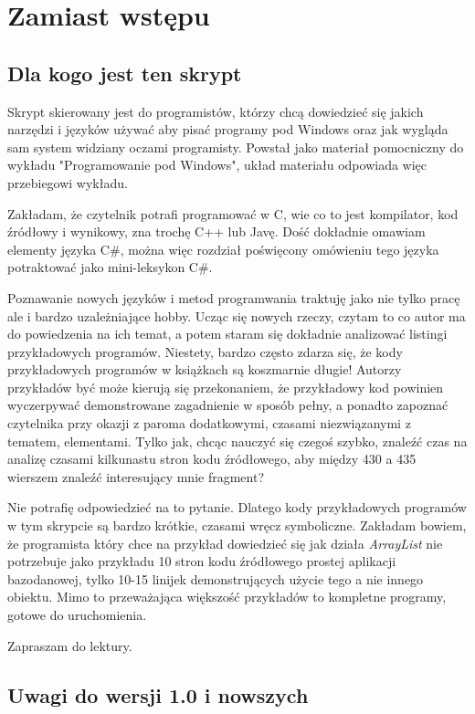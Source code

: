 ﻿\chapter*{Zamiast wstępu}

\section*{Dla kogo jest ten skrypt}

Skrypt skierowany jest do programistów, którzy chcą dowiedzieć się jakich narzędzi i języków używać
aby pisać programy pod Windows oraz jak wygląda sam system widziany oczami programisty. Powstał jako
materiał pomocniczny do wykładu "Programowanie pod Windows", układ materiału odpowiada więc 
przebiegowi wykładu.

Zakładam, że czytelnik potrafi programować w C, wie co to jest kompilator, kod źródłowy i wynikowy, zna
trochę C++ lub Javę. Dość dokładnie omawiam elementy języka C\#, można więc rozdział poświęcony omówieniu
tego języka potraktować jako mini-leksykon C\#.

Poznawanie nowych języków i metod programwania traktuję jako nie tylko pracę ale i bardzo uzależniające
hobby. Ucząc się nowych rzeczy, czytam to co autor ma do powiedzenia na ich temat, a potem
staram się dokładnie analizować listingi przykładowych programów. Niestety, bardzo często zdarza się, że
kody przykładowych programów w książkach są koszmarnie długie! Autorzy przykładów być może kierują się
przekonaniem, że przykładowy kod powinien wyczerpywać demonstrowane zagadnienie w sposób pełny, a
ponadto zapoznać czytelnika przy okazji z paroma dodatkowymi, czasami niezwiązanymi z tematem, elementami. Tylko
jak, chcąc nauczyć się czegoś szybko, znaleźć czas na analizę czasami kilkunastu stron kodu źródłowego,
aby między 430 a 435 wierszem znaleźć interesujący mnie fragment?

Nie potrafię odpowiedzieć na to pytanie. Dlatego kody przykładowych programów w tym skrypcie są bardzo
krótkie, czasami wręcz symboliczne. Zakładam bowiem, że programista który chce na przykład dowiedzieć się
jak działa {\em ArrayList} nie potrzebuje jako przykładu 10 stron kodu źródłowego prostej aplikacji bazodanowej,
tylko 10-15 linijek demonstrujących użycie tego a nie innego obiektu. Mimo to przeważająca większość 
przykładów to kompletne programy, gotowe do uruchomienia.

Zapraszam do lektury.

\section*{Uwagi do wersji 1.0 i nowszych}

